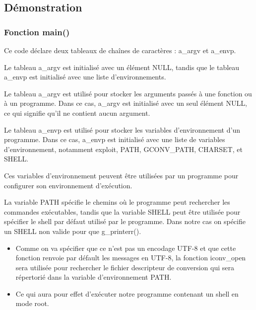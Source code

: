 \documentclass[12pt,a4paper]{article}
\begin{document}
   		\subsection{Démonstration}
			\subsubsection{Fonction main()} 
			
             \begin{flushleft}
                \noindent Ce code déclare deux tableaux de chaînes de caractères : a\_argv et a\_envp. 
                \item Le tableau a\_argv est initialisé avec un élément NULL, tandis que le tableau a\_envp est initialisé avec une liste d'environnements.
                \begin{itemsize}
                    \item Le tableau a\_argv est utilisé pour stocker les arguments passés à une fonction ou à un programme. Dans ce cas, a\_argv est initialisé avec un seul élément NULL, ce qui signifie qu'il ne contient aucun argument.
                    \item Le tableau a\_envp est utilisé pour stocker les variables d'environnement d'un programme. Dans ce cas, a\_envp est initialisé avec une liste de variables d'environnement, notamment exploit, PATH, GCONV\_PATH, CHARSET, et SHELL. 
                \end{itemsize}
                \item Ces variables d'environnement peuvent être utilisées par un programme pour configurer son environnement d'exécution. 
                \item La variable PATH spécifie le chemins où le programme peut rechercher les commandes exécutables, tandis que la variable SHELL peut être utilisée pour spécifier le shell par défaut utilisé par le programme. Dans notre cas on spécifie un SHELL non valide pour que g\_printerr(). 
                \begin{itemize}
                     \item Comme on va spécifier que ce n'est pas un encodage UTF-8 et que cette fonction renvoie par défault les messages en UTF-8, la fonction iconv\_open sera utilisée pour rechercher le fichier descripteur de conversion qui sera répertorié dans la variable d'environnement PATH.
                \item Ce qui aura pour effet d'exécuter notre programme contenant un shell en mode root.
                \end{itemize}
               
            \end{flushleft}
\end{document}
